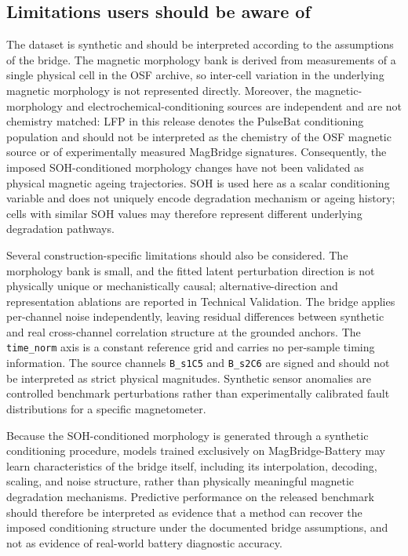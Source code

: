 \documentclass[11pt]{article}
\begin{document}
\subsection*{Limitations users should be aware of}

The dataset is synthetic and should be interpreted according to the
assumptions of the bridge. The magnetic morphology bank is derived from
measurements of a single physical cell in the OSF archive, so inter-cell
variation in the underlying magnetic morphology is not represented directly.
Moreover, the magnetic-morphology and electrochemical-conditioning sources
are independent and are not chemistry matched: LFP in this release denotes the PulseBat conditioning population and should not be interpreted as the
chemistry of the OSF magnetic source or of experimentally measured
MagBridge signatures. Consequently, the imposed SOH-conditioned morphology
changes have not been validated as physical magnetic ageing trajectories. SOH is used here as a scalar conditioning variable and does not uniquely
encode degradation mechanism or ageing history; cells with similar SOH
values may therefore represent different underlying degradation pathways.

Several construction-specific limitations should also be considered. The
morphology bank is small, and the fitted latent perturbation direction is
not physically unique or mechanistically causal; alternative-direction and
representation ablations are reported in Technical Validation. The bridge
applies per-channel noise independently, leaving residual differences
between synthetic and real cross-channel correlation structure at the
grounded anchors. The \texttt{time\_norm} axis is a constant reference grid
and carries no per-sample timing information. The source channels
\texttt{B\_s1C5} and \texttt{B\_s2C6} are signed and should not be
interpreted as strict physical magnitudes. Synthetic sensor anomalies are
controlled benchmark perturbations rather than experimentally calibrated
fault distributions for a specific magnetometer.

Because the SOH-conditioned morphology is generated through a synthetic
conditioning procedure, models trained exclusively on MagBridge-Battery may
learn characteristics of the bridge itself, including its interpolation,
decoding, scaling, and noise structure, rather than physically meaningful
magnetic degradation mechanisms. Predictive performance on the released
benchmark should therefore be interpreted as evidence that a method can
recover the imposed conditioning structure under the documented bridge
assumptions, and not as evidence of real-world battery diagnostic accuracy.
\end{document}
